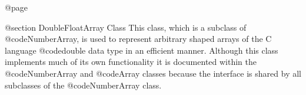 @page

@section  DoubleFloatArray Class
This class, which is a subclass of @code{NumberArray}, is used to
represent arbitrary shaped arrays of the C language @code{double} data
type in an efficient manner.  Although this class implements much of its
own functionality it is documented within the @code{NumberArray} and
@code{Array} classes because the interface is shared by all subclasses
of the @code{NumberArray} class.








